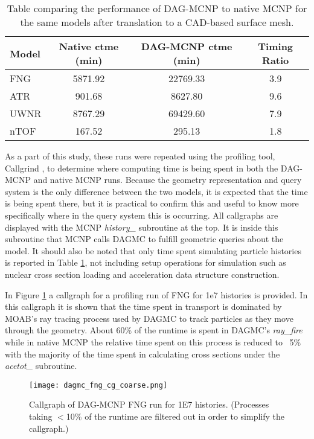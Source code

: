 \begin{table}[H]
  \centering
  \begin{tabular}{l c c c}
    \toprule
    Model & Native ctme (min) & DAG-MCNP ctme (min) & Timing Ratio \\
    \hline
    FNG   & 5871.92           & 22769.33            & 3.9   \\
    ATR   & 901.68            & 8627.80             & 9.6   \\
    UWNR  & 8767.29           & 69429.60            & 7.9   \\
    nTOF  & 167.52            & 295.13              & 1.8   \\
    \hline
  \end{tabular}
  \caption{Table comparing the performance of DAG-MCNP to native MCNP for the
    same models after translation to a CAD-based surface mesh.}
  \label{dag-mcnp-benchmarks}  
\end{table}

As a part of this study, these runs were repeated using the profiling tool,
Callgrind \cite{Pena_2016}, to determine where computing time is being spent in
both the DAG-MCNP and native MCNP runs. Because the geometry representation and
query system is the only difference between the two models, it is expected that
the time is being spent there, but it is practical to confirm this and useful to
know more specifically where in the query system this is occurring. All
callgraphs are displayed with the MCNP \textit{history\_} subroutine at the
top. It is inside this subroutine that MCNP calls DAGMC to fulfill geometric
queries about the model. It should also be noted that only time spent simulating
particle histories is reported in Table \ref{dag-mcnp-benchmarks}, not including
setup operations for simulation such as nuclear cross section loading and
acceleration data structure construction.

In Figure \ref{dagmc-fng-coarse} a callgraph for a profiling run of FNG for 1e7
histories is provided. In this callgraph it is shown that the time spent in
transport is dominated by MOAB's ray tracing process used by DAGMC to track
particles as they move through the geometry. About 60\% of the runtime is spent
in DAGMC's \textit{ray\_fire} while in native MCNP the relative time spent on
this process is reduced to ~5\% with the majority of the time spent in
calculating cross sections under the \textit{acetot\_} subroutine.

\begin{figure}[H]
  \centering
  \caption{Callgraph of DAG-MCNP FNG run for \num{1E7} histories. (Processes taking
    $<$10\% of the runtime are filtered out in order to simplify the callgraph.)}
  \label{dagmc-fng-coarse}
  \texttt{[image: dagmc\_fng\_cg\_coarse.png]}
\end{figure}

